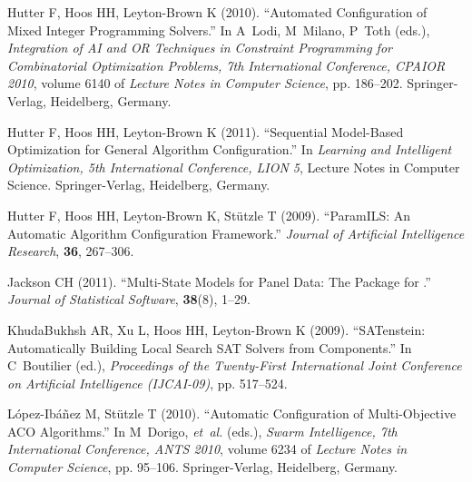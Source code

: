 \documentclass[article,a4paper,nojss,notitle]{jss}
\begin{document}
\begin{thebibliography}{34}
Hutter F, Hoos HH, Leyton-Brown K (2010).
\newblock \enquote{Automated Configuration of Mixed Integer Programming
  Solvers.}
\newblock In A~Lodi, M~Milano, P~Toth (eds.), \emph{Integration of AI and OR
  Techniques in Constraint Programming for Combinatorial Optimization Problems,
  7th International Conference, CPAIOR 2010}, volume 6140 of \emph{Lecture
  Notes in Computer Science}, pp. 186--202. Springer-Verlag, Heidelberg,
  Germany.

Hutter F, Hoos HH, Leyton-Brown K (2011).
\newblock \enquote{Sequential Model-Based Optimization for General Algorithm
  Configuration.}
\newblock In \emph{Learning and Intelligent Optimization, 5th International
  Conference, LION 5}, Lecture Notes in Computer Science. Springer-Verlag,
  Heidelberg, Germany.

Hutter F, Hoos HH, Leyton-Brown K, St{\"u}tzle T (2009).
\newblock \enquote{{ParamILS:} An Automatic Algorithm Configuration Framework.}
\newblock \emph{Journal of Artificial Intelligence Research}, \textbf{36},
  267--306.

Jackson CH (2011).
\newblock \enquote{Multi-State Models for Panel Data: The {}
  Package for .}
\newblock \emph{Journal of Statistical Software}, \textbf{38}(8), 1--29.

KhudaBukhsh AR, Xu L, Hoos HH, Leyton-Brown K (2009).
\newblock \enquote{{SATenstein}: Automatically Building Local Search {SAT}
  Solvers from Components.}
\newblock In C~Boutilier (ed.), \emph{Proceedings of the Twenty-First
  International Joint Conference on Artificial Intelligence (IJCAI-09)}, pp.
  517--524.

L{\'o}pez-Ib{\'a}{\~n}ez M, St{\"u}tzle T (2010).
\newblock \enquote{Automatic Configuration of Multi-Objective {ACO}
  Algorithms.}
\newblock In M~Dorigo, \emph{et~al.} (eds.), \emph{Swarm Intelligence, 7th
  International Conference, ANTS 2010}, volume 6234 of \emph{Lecture Notes in
  Computer Science}, pp. 95--106. Springer-Verlag, Heidelberg, Germany.


\end{thebibliography}
\end{document}
